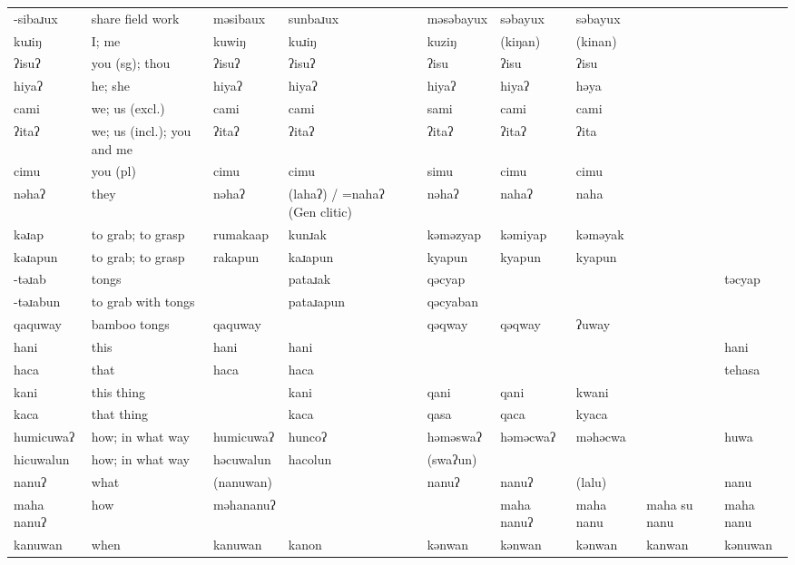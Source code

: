 \begin{landscape}
\begin{longtable}{*{9}{p{}}}
\text{*}-sibaɹux & share field work & məsibaux & sunbaɹux & məsəbayux & səbayux & səbayux &  & \\
\text{*}kuɹiŋ & I; me & kuwiŋ & kuɹiŋ & kuziŋ & (kiŋan) & (kinan) &  & \\
\text{*}ʔisuʔ & you (sg); thou & ʔisuʔ & ʔisuʔ & ʔisu & ʔisu & ʔisu &  & \\
\text{*}hiyaʔ & he; she & hiyaʔ & hiyaʔ & hiyaʔ & hiyaʔ & həya &  & \\
\text{*}cami & we; us (excl.) & cami & cami & sami & cami & cami &  & \\
\text{*}ʔitaʔ & we; us (incl.); you and me & ʔitaʔ & ʔitaʔ & ʔitaʔ & ʔitaʔ & ʔita &  & \\
\text{*}cimu & you (pl) & cimu & cimu & simu & cimu & cimu &  & \\
\text{*}nəhaʔ & they & nəhaʔ & (lahaʔ) / =nahaʔ (Gen clitic) & nəhaʔ & nahaʔ & naha &  & \\
\text{*}kəɹap & to grab; to grasp & rumakaap & kunɹak & kəməzyap & kəmiyap & kəməyak &  & \\
\text{*}kəɹapun & to grab; to grasp & rakapun & kaɹapun & kyapun & kyapun & kyapun &  & \\
\text{*}-təɹab & tongs &  & pataɹak & qəcyap &  &  &  & təcyap\\
\text{*}-təɹabun & to grab with tongs &  & pataɹapun & qəcyaban &  &  &  & \\
\text{*}qaquway & bamboo tongs & qaquway &  & qəqway & qəqway & ʔuway &  & \\
\text{*}hani & this & hani & hani &  &  &  &  & hani\\
\text{*}haca & that & haca & haca &  &  &  &  & tehasa\\
\text{*}kani & this thing &  & kani & qani & qani & kwani &  & \\
\text{*}kaca & that thing &  & kaca & qasa & qaca & kyaca &  & \\
\text{*}humicuwaʔ & how; in what way & humicuwaʔ & huncoʔ & həməswaʔ & həməcwaʔ & məhəcwa &  & huwa\\
\text{*}hicuwalun & how; in what way & həcuwalun & hacolun & (swaʔun) &  &  &  & \\
\text{*}nanuʔ & what & (nanuwan) &  & nanuʔ & nanuʔ & (lalu) &  & nanu\\
\text{*}maha nanuʔ & how & məhananuʔ &  &  & maha nanuʔ & maha nanu & maha su nanu & maha nanu\\
\text{*}kanuwan & when & kanuwan & kanon & kənwan & kənwan & kənwan & kanwan & kənuwan\\

\end{longtable}
\end{landscape}
